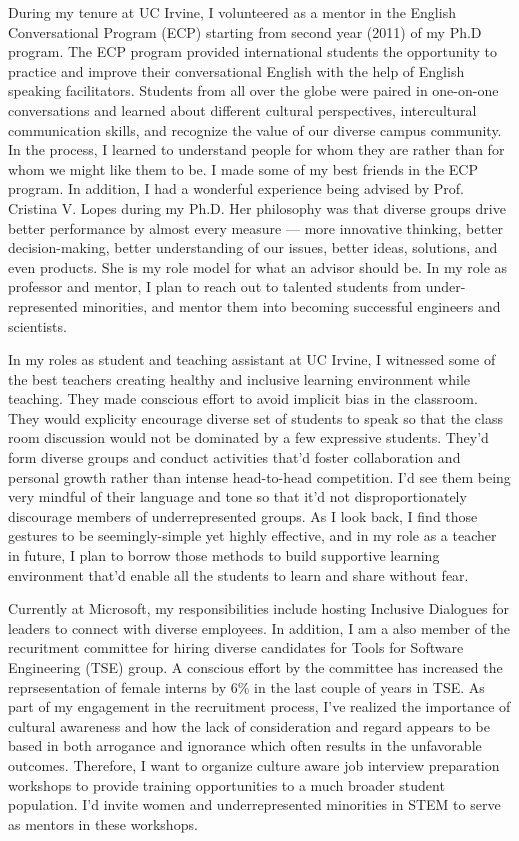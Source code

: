 \documentclass[a4papert]{article}
\begin{document}
During my tenure at UC Irvine, I volunteered as a mentor in the English Conversational Program (ECP) starting from second year (2011) of my Ph.D program. The ECP program provided international students the opportunity to practice and improve their conversational English with the help of English speaking facilitators. Students from all over the globe were paired in one-on-one conversations and learned about different cultural perspectives, intercultural communication skills, and recognize the value of our diverse campus community. In the process, I learned to understand people for whom they are rather than for whom we might like them to be. I made some of my best friends in the ECP program. 
In addition, I had a wonderful experience being advised by Prof. Cristina V. Lopes during my Ph.D. Her philosophy was that diverse groups drive better performance by almost every measure --- more innovative thinking, better decision-making, better understanding of our issues, better ideas, solutions, and even products.  She is my role model for what an advisor should be. In my role as professor and mentor, I plan to reach out to talented students from under-represented minorities, and mentor them into becoming successful engineers and scientists.  

In my roles as student and teaching assistant at UC Irvine, I witnessed some of the best teachers creating healthy and inclusive learning environment while teaching. They made conscious effort to avoid implicit bias in the classroom. They would explicity encourage diverse set of students to speak so that the class room discussion would not be dominated by a few expressive students. They'd form diverse groups and conduct activities that'd foster collaboration and personal growth rather than intense head-to-head competition. I'd see them being very mindful of their language and tone so that it'd not disproportionately discourage members of underrepresented groups. As I look back, I find those gestures to be seemingly-simple yet highly effective, and in my role as a teacher in future, I plan to borrow those methods to build supportive learning environment that'd enable all the students to learn and share without fear.

Currently at Microsoft, my responsibilities include hosting Inclusive Dialogues for leaders to connect with diverse employees. In addition, I am a also member of the recuritment committee for hiring diverse candidates for Tools for Software Engineering (TSE) group. A conscious effort by the committee has increased the reprsesentation of female interns by 6\% in the last couple of years in TSE. As part of my engagement in the recruitment process, I've realized the importance of cultural awareness and how the lack of consideration and regard appears to be based in both arrogance and ignorance which often results in the unfavorable outcomes. Therefore, I want to organize culture aware job interview preparation workshops to provide training opportunities to a much broader student population. I'd invite women and underrepresented minorities in STEM to serve as mentors in these workshops. 
\end{document}
